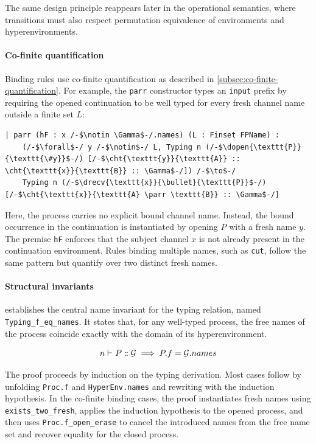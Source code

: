 The same design principle reappears later in the operational semantics, where transitions must also respect permutation equivalence of environments and hyperenvironments.

\paragraph{Co-finite quantification}
Binding rules use co-finite quantification as described in \cref{subsec:co-finite-quantification}. For example, the \texttt{parr} constructor types an \texttt{input} prefix by requiring the opened continuation to be well typed for every fresh channel name outside a finite set $L$:

\begin{lstlisting}[language=Lean4]
| parr (hF : x /-$\notin \Gamma$-/.names) (L : Finset FPName) :
    (/-$\forall$-/ y /-$\notin$-/ L, Typing n (/-$\dopen{\texttt{P}}{\texttt{\#y}}$-/) [/-$\cht{\texttt{y}}{\texttt{A}} :: \cht{\texttt{x}}{\texttt{B}} :: \Gamma$-/]) /-$\to$-/
    Typing n (/-$\drecv{\texttt{x}}{\bullet}{\texttt{P}}$-/) [/-$\cht{\texttt{x}}{\texttt{A} \parr \texttt{B}} :: \Gamma$-/]
\end{lstlisting}

Here, the process carries no explicit bound channel name. Instead, the bound occurrence in the continuation is instantiated by opening $P$ with a fresh name $y$. The premise \texttt{hF} enforces that the subject channel $x$ is not already present in the continuation environment. Rules binding multiple names, such as \texttt{cut}, follow the same pattern but quantify over two distinct fresh names.

\paragraph{Structural invariants}  establishes the central name invariant for the typing relation, named \texttt{Typing\_f\_eq\_names}. It states that, for any well-typed process, the free names of the process coincide exactly with the domain of its hyperenvironment.

\begin{highlight}
\[
{{}n \vdash_{} P \mathrel{:\mspace{-1mu}:} \mathcal{G}} \implies P.f = \mathcal{G}.names
\]
\end{highlight}

The proof proceeds by induction on the typing derivation. Most cases follow by unfolding \texttt{Proc.f} and \texttt{HyperEnv.names} and rewriting with the induction hypothesis. In the co-finite binding cases, the proof instantiates fresh names using \texttt{exists\_two\_fresh}, applies the induction hypothesis to the opened process, and then uses \texttt{Proc.f\_open\_erase} to cancel the introduced names from the free name set and recover equality for the closed process.

